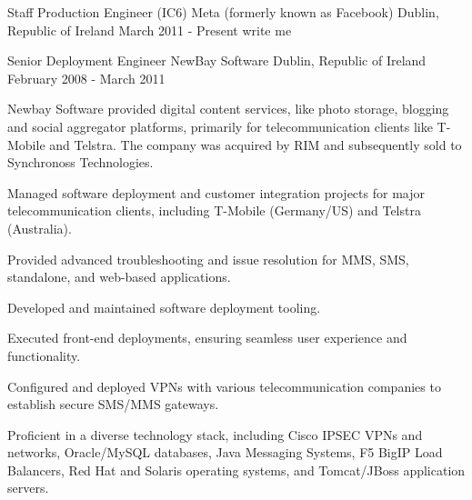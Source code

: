 

\begin{cventries}

  \cventry
  {Staff Production Engineer (IC6)} %
  {Meta (formerly known as Facebook)} %
  {Dublin, Republic of Ireland} %
  {March 2011 - Present} %
  {
    write me
  }

  \cventry
  {Senior Deployment Engineer} %
  {NewBay Software} %
  {Dublin, Republic of Ireland} %
  {February 2008 - March 2011} %
  {
    Newbay Software provided digital content services, like photo storage, blogging and social aggregator platforms,
    primarily for telecommunication clients like T-Mobile and Telstra.
    The company was acquired by RIM and subsequently sold to Synchronoss Technologies.
    \vspace{2mm}
    \begin{cvitems} %
      \item Managed software deployment and customer integration projects for major telecommunication clients, including T-Mobile (Germany/US) and Telstra (Australia).
      \item Provided advanced troubleshooting and issue resolution for MMS, SMS, standalone, and web-based applications.
      \item Developed and maintained software deployment tooling.
      \item Executed front-end deployments, ensuring seamless user experience and functionality.
      \item Configured and deployed VPNs with various telecommunication companies to establish secure SMS/MMS gateways.
      \item Proficient in a diverse technology stack, including Cisco IPSEC VPNs and networks, Oracle/MySQL databases, Java Messaging Systems, F5 BigIP Load Balancers, Red Hat and Solaris operating systems, and Tomcat/JBoss application servers.
    \end{cvitems}
  }


\end{cventries}
